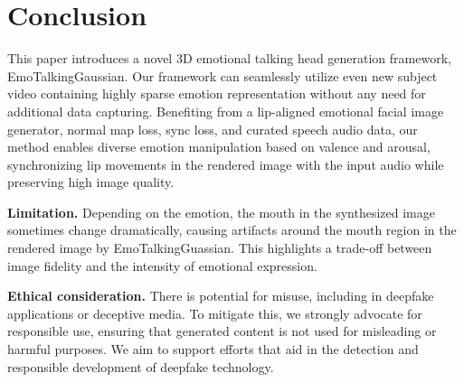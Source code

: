 \section{Conclusion}
\label{sec:conclusion}

This paper introduces a novel 3D emotional talking head generation framework, EmoTalkingGaussian. Our framework can seamlessly utilize even new subject video containing highly sparse emotion representation without any need for additional data capturing. Benefiting from a lip-aligned emotional facial image generator, normal map loss, sync loss, and curated speech audio data, our method enables diverse emotion manipulation based on valence and arousal, synchronizing lip movements in the rendered image with the input audio while preserving high image quality.

\noindent\textbf{Limitation.} Depending on the emotion, the mouth in the synthesized image sometimes change dramatically, causing artifacts around the mouth region in the rendered image by EmoTalkingGuassian. This highlights a trade-off between image fidelity and the intensity of emotional expression.

\noindent\textbf{Ethical consideration.} There is potential for misuse, including in deepfake applications or deceptive media. To mitigate this, we strongly advocate for responsible use, ensuring that generated content is not used for misleading or harmful purposes. We aim to support efforts that aid in the detection and responsible development of deepfake technology.

